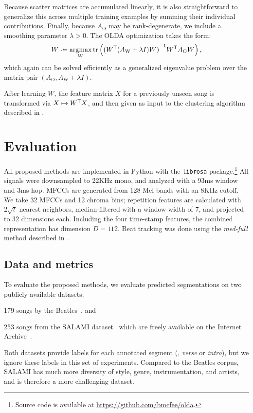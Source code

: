 \documentclass{article}
\begin{document}
Because scatter matrices are accumulated linearly, it is also straightforward to generalize this across multiple training examples
by summing their individual contributions.  Finally, because $A_\text{O}$ may be rank-degenerate, we include a smoothing parameter
$\lambda > 0$.  The OLDA optimization takes the form:
\begin{equation}
W \defeq \argmax_W \trace\left( {(W\trans (A_\text{W} + \lambda I) W)}^{-1} W\trans A_\text{O} W \right) \label{eq:olda},
\end{equation}
which again can be solved efficiently as a generalized eigenvalue problem over the matrix pair 
$(A_\text{O}, A_\text{W} + \lambda I)$.

After learning $W$, the feature matrix $X$ for a previously unseen song is transformed via $X \mapsto W^\mathsf{T} X$, and then 
given as input to the clustering algorithm described in .

\section{Evaluation}
\label{sec:eval}
All proposed methods are implemented in Python with the \texttt{librosa} package.\footnote{Source code is
available at \url{https://github.com/bmcfee/olda}.}  
All signals were downsampled to 22KHz mono, and analyzed with a 93ms window and 3ms hop.  MFCCs are generated from 128 Mel bands
with an 8KHz cutoff. We take 32 MFCCs and 12 chroma bins; repetition features are calculated with $2\sqrt{t}$ nearest neighbors,
median-filtered with a window width of 7, and projected to 32 dimensions each.  Including the four time-stamp features, the combined
representation has dimension $D=112$. Beat tracking was done using the \emph{med-full} method described in~\cite{mcfee2014beat}.

\subsection{Data and metrics}
To evaluate the proposed methods, we evaluate predicted segmentations on two publicly available datasets:
\begin{description}\addtolength{\itemsep}{-0.25\baselineskip}%
\item[Beatles-ISO] 179 songs by the Beatles~\cite{harte2010towards,isophonicsbeatles}, and
\item[SALAMI-free] 253 songs from the SALAMI dataset~\cite{smith2011design} which are freely available on the 
Internet Archive~\cite{nieto2013convex}.
\end{description}
Both datasets provide labels for each annotated segment (\eg, \emph{verse} or \emph{intro}), but we ignore these
labels in this set of experiments. Compared to the Beatles corpus, SALAMI has much more diversity of style, genre, 
instrumentation, and artists, and is therefore a more challenging dataset.
\end{document}
